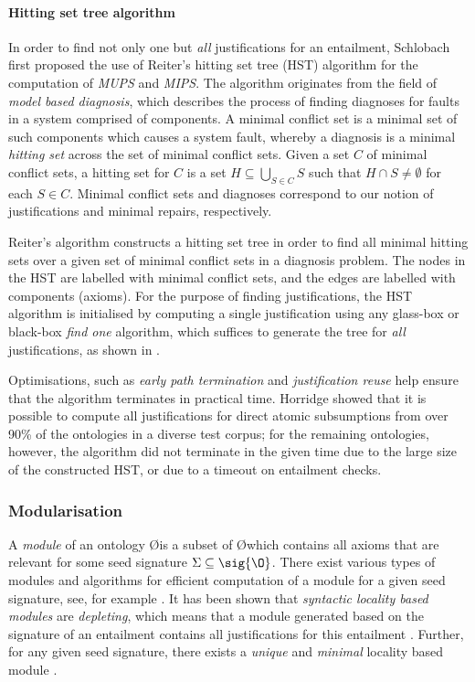\paragraph{Hitting set tree algorithm}
In order to find not only one but \emph{all} justifications for an entailment, Schlobach \cite{schlobach05vd} first proposed the use of Reiter's hitting set tree (HST) algorithm \cite{reiter87pb,greiner89jl} for the computation of \emph{MUPS} and \emph{MIPS}. The algorithm originates from the field of \emph{model based diagnosis}, which describes the process of finding diagnoses for faults in a system comprised of components. A minimal conflict set is a minimal set of such components which causes a system fault, whereby a diagnosis is a minimal \emph{hitting set} across the set of minimal conflict sets. Given a set $C$ of minimal conflict sets, a hitting set for $C$ is a set $H \subseteq \bigcup_{S \in C} S$ such that $H \cap S \not= \emptyset$ for each $S \in C$. Minimal conflict sets and diagnoses correspond to our notion of justifications and minimal repairs, respectively. 

Reiter's algorithm constructs a hitting set tree in order to find all minimal hitting sets over a given set of minimal conflict sets in a diagnosis problem. The nodes in the HST are labelled with minimal conflict sets, and the edges are labelled with components (axioms). For the purpose of finding justifications, the HST algorithm is initialised by computing a single justification using any glass-box or black-box \emph{find one} algorithm, which suffices to generate the tree for \emph{all} justifications, as shown in \cite{kalyanpur07oq}. 

Optimisations, such as \emph{early path termination} and \emph{justification reuse} \cite{kalyanpur07oq} help ensure that the algorithm terminates in practical time. Horridge \cite{horridge11ab} showed that it is possible to compute all justifications for direct atomic subsumptions from over 90\% of the ontologies in a diverse test corpus; for the remaining ontologies, however, the algorithm did not terminate in the given time due to the large size of the constructed HST, or due to a timeout on entailment checks.



\subsubsection{Modularisation} A \emph{module} \module of an ontology \O is a subset of \O which contains all axioms that are relevant for some seed signature $\Sigma \subseteq \sig{\O}$. There exist various types of modules and algorithms for efficient computation of a module for a given seed signature, see, for example \cite{cuenca-grau06ga,cuenca-grau07ci,sattler09jb}. It has been shown that \emph{syntactic locality based modules} are \emph{depleting}, which means that a module generated based on the signature of an entailment contains all justifications for this entailment \cite{cuenca-grau07ci}. Further, for any given seed signature, there exists a \emph{unique} and \emph{minimal} locality based module \cite{cuenca-grau08sj}. 

